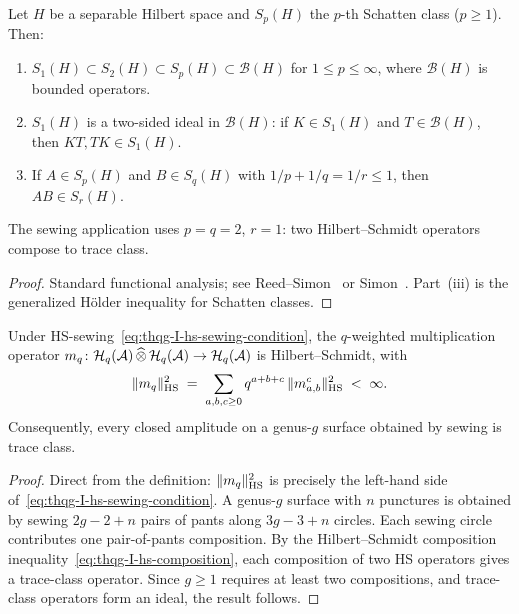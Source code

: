 \begin{lemma}
\label{lem:thqg-I-schatten}
Let $H$ be a separable Hilbert space and $S_p(H)$ the $p$-th Schatten class ($p \geq 1$). Then:
\begin{enumerate}[label=\textup{(\roman*)}]
\item $S_1(H) \subset S_2(H) \subset S_p(H) \subset \mathcal{B}(H)$ for $1 \leq p \leq \infty$, where $\mathcal{B}(H)$ is bounded operators.
\item $S_1(H)$ is a two-sided ideal in $\mathcal{B}(H)$: if $K \in S_1(H)$ and $T \in \mathcal{B}(H)$, then $KT, TK \in S_1(H)$.
\item If $A \in S_p(H)$ and $B \in S_q(H)$ with $1/p + 1/q = 1/r \leq 1$, then $AB \in S_r(H)$.
\end{enumerate}
The sewing application uses $p = q = 2$, $r = 1$: two Hilbert--Schmidt operators compose to trace class.
\end{lemma}

\begin{proof}
Standard functional analysis; see Reed--Simon~\cite{RS78} or Simon~\cite{Simon05}. Part~(iii) is the generalized H\"older inequality for Schatten classes.
\end{proof}

\begin{proposition}
\label{prop:thqg-I-pants-hs}
Under HS-sewing~\eqref{eq:thqg-I-hs-sewing-condition}, the $q$-weighted multiplication operator $m_q \colon \mathcal{H}_q(\mathcal{A}) \,\widehat{\otimes}\, \mathcal{H}_q(\mathcal{A}) \to \mathcal{H}_q(\mathcal{A})$ is Hilbert--Schmidt, with
\begin{equation}\label{eq:thqg-I-mq-hs-bound}
\|m_q\|_{\operatorname{HS}}^2 \;=\; \sum_{a,b,c \geq 0} q^{a+b+c}\,\|m^c_{a,b}\|_{\operatorname{HS}}^2 \;<\; \infty.
\end{equation}
Consequently, every closed amplitude on a genus-$g$ surface obtained by sewing is trace class.
\end{proposition}

\begin{proof}
Direct from the definition: $\|m_q\|_{\operatorname{HS}}^2$ is precisely the left-hand side of~\eqref{eq:thqg-I-hs-sewing-condition}. A genus-$g$ surface with $n$ punctures is obtained by sewing $2g - 2 + n$ pairs of pants along $3g - 3 + n$ circles. Each sewing circle contributes one pair-of-pants composition. By the Hilbert--Schmidt composition inequality~\eqref{eq:thqg-I-hs-composition}, each composition of two HS operators gives a trace-class operator. Since $g \geq 1$ requires at least two compositions, and trace-class operators form an ideal, the result follows.
\end{proof}

